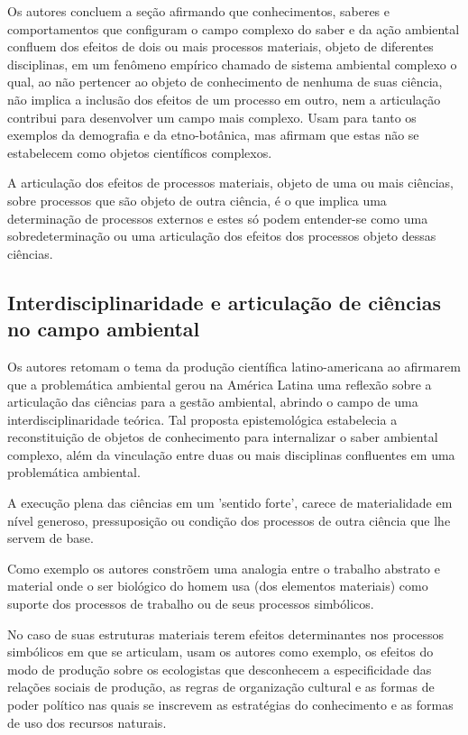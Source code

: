 \documentclass[
   article,       %
   12pt,          %
   oneside,       %
   a4paper,       %
   english,       %
   brazil,           %
   sumario=tradicional
   ]{abntex2}
\begin{document}
Os autores concluem a seção afirmando que conhecimentos, saberes e comportamentos que configuram o campo complexo do saber e da ação ambiental  confluem dos efeitos de dois ou mais processos materiais, objeto de diferentes disciplinas, em um fenômeno empírico chamado de sistema ambiental complexo o qual, ao não pertencer ao objeto de conhecimento de nenhuma de suas ciência, não implica a inclusão dos efeitos de um processo em outro, nem a articulação contribui para desenvolver um campo mais complexo. Usam para tanto os exemplos da demografia e da etno-botânica, mas afirmam que estas não se estabelecem como objetos científicos complexos. 

A articulação dos efeitos de processos materiais, objeto de uma ou mais ciências, sobre processos que são objeto de outra ciência, é o que implica uma determinação de processos externos e estes só podem entender-se como uma sobredeterminação ou uma articulação dos efeitos dos processos objeto dessas ciências.


\subsection{Interdisciplinaridade e articulação de ciências no campo ambiental}


Os autores retomam o tema da produção científica latino-americana ao afirmarem que a problemática ambiental gerou na América Latina uma reflexão sobre a articulação das ciências para a gestão ambiental, abrindo o campo de uma interdisciplinaridade teórica. Tal proposta epistemológica estabelecia a reconstituição de objetos de conhecimento para internalizar o saber ambiental complexo, além da vinculação entre duas ou mais disciplinas confluentes em uma problemática ambiental. 

A execução plena das ciências em um 'sentido forte', carece de materialidade em nível generoso, pressuposição ou condição dos processos de outra ciência que lhe servem de base. 

Como exemplo os autores constrõem uma analogia entre o trabalho abstrato e material onde o ser biológico do homem usa (dos elementos materiais) como suporte dos processos de trabalho ou de seus processos simbólicos.

No caso de suas estruturas materiais terem efeitos determinantes nos processos simbólicos em que se articulam, usam os autores como exemplo, os efeitos do modo de produção sobre os ecologistas que desconhecem a especificidade das relações sociais de produção, as regras de organização cultural e as formas de poder político nas quais se inscrevem as estratégias do conhecimento e as formas de uso dos recursos naturais. 
\end{document}
